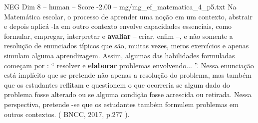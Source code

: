 \begin{textsample}{NEG Dim 8 – human – Score -2.00 – mg/mg\_ef\_matematica\_4\_p5.txt}  \label{ex:f8_neg_004}
Na Matemática escolar, o processo de aprender uma noção em um contexto, abstrair e depois aplicá -la em outro contexto envolve capacidades essenciais, como formular, empregar, interpretar e \textbf{avaliar} – criar, enfim –, e não somente a resolução de enunciados típicos que são, muitas vezes, meros exercícios e apenas simulam alguma aprendizagem.
Assim, algumas das habilidades formuladas começam por : “ resolver e \textbf{elaborar} problemas envolvendo... ”.
Nessa enunciação está implícito que se pretende não apenas a resolução do problema, mas também que os estudantes reflitam e questionem o que ocorreria se algum dado do problema fosse alterado ou se alguma condição fosse acrescida ou retirada.
Nessa perspectiva, pretende -se que os estudantes também formulem problemas em outros contextos. ( BNCC, 2017, p.277 ).

\end{textsample}
